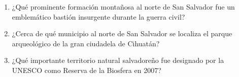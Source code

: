 \documentclass[10pt,a4paper]{article}
\begin{document}
\begin{enumerate}[label=\textbf{\arabic*.}]
\begin{enumerate}[label=\textbf{\Alph*)}]
\end{enumerate}
\vspace{0.15cm}
\item ¿Qué prominente formación montañosa al norte de San Salvador fue un emblemático bastión insurgente durante la guerra civil?
\begin{enumerate}[label=\textbf{\Alph*)}]
\end{enumerate}
\vspace{0.15cm}
\item ¿Cerca de qué municipio al norte de San Salvador se localiza el parque arqueológico de la gran ciudadela de Cihuatán?
\begin{enumerate}[label=\textbf{\Alph*)}]
\end{enumerate}
\vspace{0.15cm}
\item ¿Qué importante territorio natural salvadoreño fue designado por la UNESCO como Reserva de la Biosfera en 2007?
\begin{enumerate}[label=\textbf{\Alph*)}]
\end{enumerate}
\vspace{0.15cm}
\end{enumerate}\n
\vspace{0.4cm}
\end{document}
